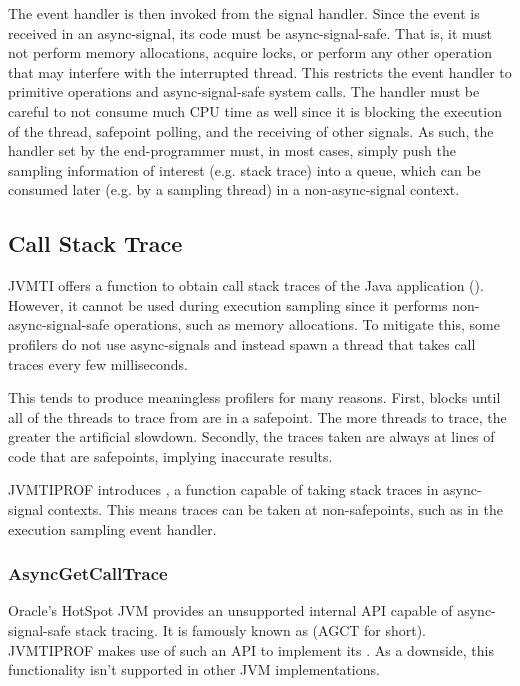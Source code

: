 The event handler is then invoked from the signal handler. Since the event is received in an async-signal, its code must be async-signal-safe. That is, it must not perform memory allocations, acquire locks, or perform any other operation that may interfere with the interrupted thread. This restricts the event handler to primitive operations and async-signal-safe system calls. The handler must be careful to not consume much CPU time as well since it is blocking the execution of the thread, safepoint polling, and the receiving of other signals. As such, the handler set by the end-programmer must, in most cases, simply push the sampling information of interest (e.g. stack trace) into a queue, which can be consumed later (e.g. by a sampling thread) in a non-async-signal context.


\subsection{Call Stack Trace} \label{sec:impl_callstacktrace}

JVMTI offers a function to obtain call stack traces of the Java application (). However, it cannot be used during execution sampling since it performs non-async-signal-safe operations, such as memory allocations. To mitigate this, some profilers do not use async-signals and instead spawn a thread that takes call traces every few milliseconds.

This tends to produce meaningless profilers for many reasons. First,  blocks until all of the threads to trace from are in a safepoint. The more threads to trace, the greater the artificial slowdown. Secondly, the traces taken are always at lines of code that are safepoints, implying inaccurate results.

JVMTIPROF introduces , a function capable of taking stack traces in async-signal contexts. This means traces can be taken at non-safepoints, such as in the execution sampling event handler.

\subsubsection*{AsyncGetCallTrace}

Oracle's HotSpot JVM provides an unsupported internal API capable of async-signal-safe stack tracing. It is famously known as  (AGCT for short). JVMTIPROF makes use of such an API to implement its . As a downside, this functionality isn't supported in other JVM implementations.

